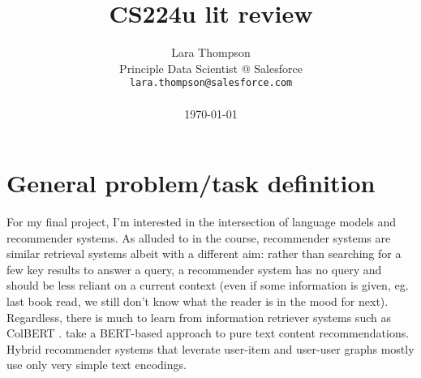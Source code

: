 \documentclass[11pt]{article}
\title{CS224u lit review}
\author{Lara Thompson \\
  Principle Data Scientist @ Salesforce \\
  \texttt{lara.thompson@salesforce.com} \\ \\
  \today \\
}
\begin{document}
\maketitle







\section{General problem/task definition}

For my final project, I'm interested in the intersection of language models and recommender systems. As alluded to in the course, recommender systems are similar retrieval systems albeit with a different aim: rather than searching for a few key results to answer a query, a recommender system has no query and should be less reliant on a current context (even if some information is given, eg. last book read, we still don't know what the reader is in the mood for next). Regardless, there is much to learn from information retriever systems such as ColBERT \cite{ColBERT}. \cite{Malkiel2020} take a BERT-based approach to pure text content recommendations.  Hybrid recommender systems that leverate user-item and user-user graphs mostly use only very simple text encodings.  
\end{document}
